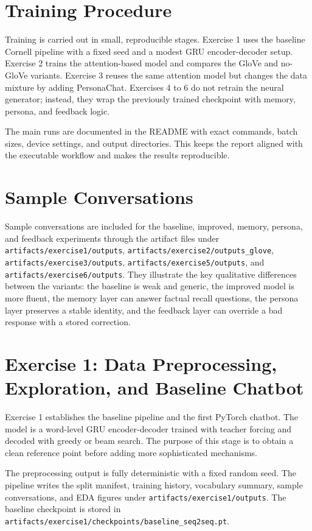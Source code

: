 \documentclass[11pt,a4paper]{article}
\begin{document}
\section{Training Procedure}
Training is carried out in small, reproducible stages. Exercise 1 uses the baseline Cornell pipeline with a fixed seed and a modest GRU encoder-decoder setup. Exercise 2 trains the attention-based model and compares the GloVe and no-GloVe variants. Exercise 3 reuses the same attention model but changes the data mixture by adding PersonaChat. Exercises 4 to 6 do not retrain the neural generator; instead, they wrap the previously trained checkpoint with memory, persona, and feedback logic.

The main runs are documented in the README with exact commands, batch sizes, device settings, and output directories. This keeps the report aligned with the executable workflow and makes the results reproducible.

\section{Sample Conversations}
Sample conversations are included for the baseline, improved, memory, persona, and feedback experiments through the artifact files under \texttt{artifacts/exercise1/outputs}, \texttt{artifacts/exercise2/outputs\_glove}, \texttt{artifacts/exercise3/outputs}, \texttt{artifacts/exercise5/outputs}, and \texttt{artifacts/exercise6/outputs}. They illustrate the key qualitative differences between the variants: the baseline is weak and generic, the improved model is more fluent, the memory layer can answer factual recall questions, the persona layer preserves a stable identity, and the feedback layer can override a bad response with a stored correction.

\section{Exercise 1: Data Preprocessing, Exploration, and Baseline Chatbot}
Exercise 1 establishes the baseline pipeline and the first PyTorch chatbot. The model is a word-level GRU encoder-decoder trained with teacher forcing and decoded with greedy or beam search. The purpose of this stage is to obtain a clean reference point before adding more sophisticated mechanisms.

The preprocessing output is fully deterministic with a fixed random seed. The pipeline writes the split manifest, training history, vocabulary summary, sample conversations, and EDA figures under \texttt{artifacts/exercise1/outputs}. The baseline checkpoint is stored in \texttt{artifacts/exercise1/checkpoints/baseline\_seq2seq.pt}.
\end{document}
